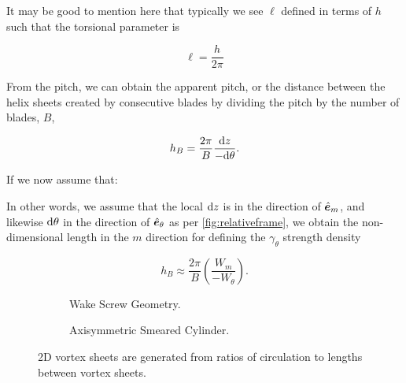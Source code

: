 It may be good to mention here that typically we see \(\ell\) defined in terms of \(h\) such that the torsional parameter is

\begin{equation}
    \ell = \frac{h}{2\pi}
\end{equation}

\noindent From the pitch, we can obtain the apparent pitch, or the distance between the helix sheets created by consecutive blades by dividing the pitch by the number of blades, \(B\),

\begin{equation}
    h_B = \frac{2\pi}{B}  \frac{\mathrm{d} z}{-\mathrm{d} \theta}.
\end{equation}

If we now assume that:

\begin{assumption}




\end{assumption}

\noindent In other words, we assume that the local \(\mathrm{d} z\) is in the direction of \(\hat{\bm{e}}_m\), and likewise \(\mathrm{d}\theta\) in the direction of \(\hat{\bm{e}}_\theta\) as per \cref{fig:relativeframe}, we obtain the non-dimensional length in the \(m\) direction for defining the \(\gamma_\theta\) strength density

\begin{equation}
    h_B \approx \frac{2\pi}{B} \left(\frac{W_m}{-W_\theta}\right).
\end{equation}

\begin{figure}[htb]
     \centering
     \begin{subfigure}[t]{0.45\textwidth}
        \centering
        
        \caption{Wake Screw Geometry.}
        \label{}
     \end{subfigure}
     \hfill
     \begin{subfigure}[t]{0.45\textwidth}
         \centering
        
        \caption{Axisymmetric Smeared Cylinder.}
        \label{}
     \end{subfigure}
     \caption{2D vortex sheets are generated from ratios of circulation to lengths between vortex sheets.}
    \label{fig:smearscrew}
\end{figure}

